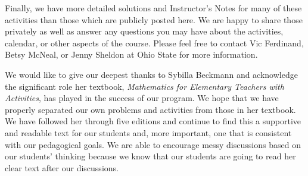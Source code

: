 \documentclass[nooutcomes]{ximera}
\begin{document}
Finally, we have more detailed solutions and Instructor's Notes for many of these activities than those 
which are publicly posted here.  We are happy to share those privately as well as answer any 
questions you may have about the activities, calendar, or other aspects of the course.  Please feel 
free to contact Vic Ferdinand, Betsy McNeal, or Jenny Sheldon at Ohio State for more information.

We would like to give our deepest thanks to Sybilla Beckmann and acknowledge the significant role her textbook, \emph{Mathematics for Elementary Teachers with Activities}, has played in the success of our program.  We hope that we have properly separated our own problems and activities from those in her textbook. We have followed her through five editions and continue to find this a supportive and readable text for our students and, more important, one that is consistent with our pedagogical goals. We are able to encourage messy discussions based on our students' thinking because we know that our students are going to read her clear text after our discussions.  
\end{document}
